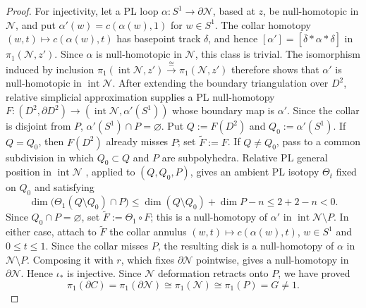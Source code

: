 \documentclass[12pt,oneside,a4paper]{article}
\theoremstyle{mytheorem}
\theoremstyle{remark}
\theoremstyle{definition}
\begin{document}
\begin{proof}
For injectivity, let a PL loop $\alpha:S^1\to\partial\mathcal{N}$, based at $z$,
be null-homotopic in $\mathcal{N}$, and put
$\alpha'(w)=c(\alpha(w),1)$ for $w\in S^1$.  The collar homotopy
$(w,t)\mapsto c(\alpha(w),t)$ has basepoint track $\delta$, and hence
\([\alpha']=[\overline\delta*\alpha*\delta]\)
in \(\pi_1(\mathcal{N},z')\).
Since $\alpha$ is null-homotopic in $\mathcal{N}$, this class is trivial.
The isomorphism induced by inclusion
$\pi_1(\operatorname{int}\mathcal{N},z')
\xrightarrow{\ \cong\ }\pi_1(\mathcal{N},z')$
therefore shows that $\alpha'$ is null-homotopic in
$\operatorname{int}\mathcal{N}$.  After extending the boundary
triangulation over $D^2$, relative simplicial approximation
\cite{zbMATH03195022} supplies a PL null-homotopy
$F:(D^2,\partial D^2)\to(\operatorname{int}\mathcal{N},\alpha'(S^1))$ whose
boundary map is $\alpha'$.  Since the collar is disjoint from $P$,
$\alpha'(S^1)\cap P=\varnothing$.  Put
$Q:=F(D^2)$ and $Q_0:=\alpha'(S^1)$.  If $Q=Q_0$, then $F(D^2)$ already
misses $P$; set $\widetilde F:=F$.  If $Q\ne Q_0$, pass to a common
subdivision in which $Q_0\subset Q$ and $P$ are subpolyhedra.  Relative
PL general position in $\operatorname{int}\mathcal{N}$
\cite[Theorem~4.2]{zbMATH01714503}, applied to $(Q,Q_0,P)$, gives an
ambient PL isotopy $\Theta_t$ fixed on $Q_0$ and satisfying
\[
 \dim\bigl(\Theta_1(Q\setminus Q_0)\cap P\bigr)
 \leq\dim(Q\setminus Q_0)+\dim P-n
 \leq2+2-n<0.
\]
Since $Q_0\cap P=\varnothing$, set $\widetilde F:=\Theta_1\circ F$;
this is a null-homotopy of $\alpha'$ in
$\operatorname{int}\mathcal{N}\setminus P$.  In either case, attach to
$\widetilde F$ the
collar annulus
$(w,t)\mapsto c(\alpha(w),t)$, $w\in S^1$ and $0\leq t\leq1$.  Since the collar misses
$P$, the resulting disk is a null-homotopy of $\alpha$ in
$\mathcal{N}\setminus P$.  Composing it with $r$, which fixes $\partial\mathcal{N}$
pointwise, gives a null-homotopy in $\partial\mathcal{N}$.  Hence
$\iota_*$ is injective.
Since $\mathcal{N}$ deformation retracts onto $P$, we have proved
\begin{equation}\label{eq:newman-boundary-group}
 \pi_1(\partial C)=\pi_1(\partial\mathcal{N})
 \cong\pi_1(\mathcal{N})\cong\pi_1(P)=G\ne1.
\end{equation}


\end{proof}
\end{document}
